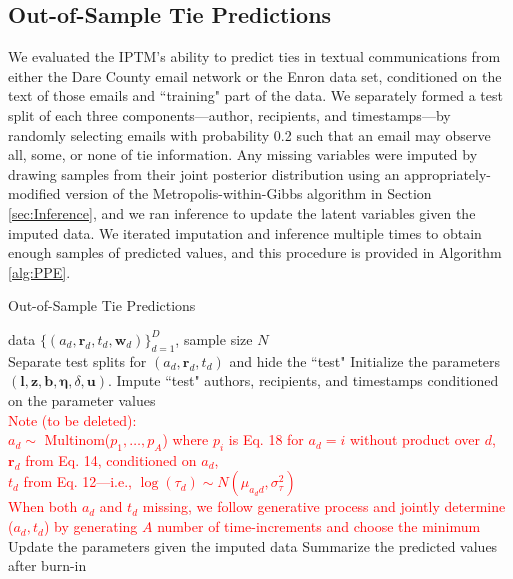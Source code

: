 \documentclass{article}
\begin{document}
\subsection{Out-of-Sample Tie Predictions}\label{subsec:Tie Prediction}
We evaluated the IPTM's ability to predict ties in textual communications from either the Dare County email network or the Enron data set, conditioned on the text of those emails and ``training" part of the data. We separately formed a test split of each three components---author, recipients, and timestamps---by randomly selecting emails with probability 0.2 such that an email may observe all, some, or none of tie information. Any missing variables were imputed by drawing samples from their joint posterior distribution using an appropriately-modified version of the Metropolis-within-Gibbs algorithm in Section \ref{sec:Inference}, and we ran inference to update the latent variables  given the imputed data. We iterated imputation and inference multiple times to obtain enough samples of predicted values, and this procedure is provided in Algorithm \ref{alg:PPE}.

\begin{algorithm}[ht]
	\caption{Out-of-Sample Tie Predictions}
	\label{alg:PPE}
	\begin{algorithmic}
		 data $ \{ (a_d, \boldsymbol{r}_d, t_d,  \boldsymbol{w}_d)\}_{d=1}^D$, sample size $N$\\
		Separate test splits for $(a_d, \boldsymbol{r}_d, t_d)$ and hide the ``test"
		\STATE Initialize the parameters $(\boldsymbol{l}, \boldsymbol{z}, \boldsymbol{b}, \boldsymbol{\eta},\delta, \boldsymbol{u})$.
		\STATE Impute ``test" authors, recipients, and timestamps conditioned on the parameter values\\
		\textcolor{red}{Note (to be deleted):\\
			 $a_d\sim$ Multinom($p_1,\ldots,p_A$) where $p_i$ is Eq. 18 for $a_d=i$ without product over $d$, \\
			 $\boldsymbol{r}_d$ from Eq. 14, conditioned on $a_d$, \\
			 $t_d$ from Eq. 12---i.e., $\log(\tau_d) \sim N(\mu_{a_dd}, \sigma_{\tau}^2)$\\
			 When both $a_d$ and $t_d$ missing, we follow generative process and jointly determine ($a_d, t_d$) by generating $A$ number of time-increments and choose the minimum}
		\STATE Update the parameters given the imputed data
		\ENDFOR
		\STATE Summarize the predicted values after burn-in
		\end{algorithmic}
\end{algorithm}
\end{document}
